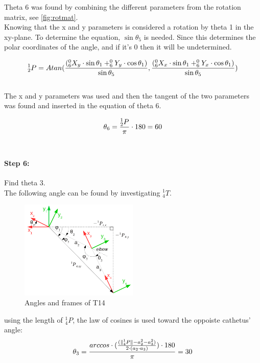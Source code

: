 Theta 6 was found by combining the different parameters from the rotation matrix, see \ref{fig:rotmat}.\\
Knowing that the x and y parameters is considered a rotation by theta 1 in the xy-plane. To determine the equation, $\sin{\theta_5}$ is needed. Since this determines the polar coordinates of the angle, and if it's 0 then it will be undetermined.

\begin{equation}
\centering
_2^1P = Atan(\frac{(_6^0X_y\cdot\sin{\theta_1}+_6^0Y_y\cdot\cos{\theta_1})}{\sin{\theta_5}},\frac{(_6^0X_x\cdot\sin{\theta_1}+_6^0Y_x\cdot\cos{\theta_1})}{\sin{\theta_5}})
\label{P12}
\end{equation}\\

The x and y parameters was used and then the tangent of the two parameters was found and inserted in the equation of theta 6.

\begin{equation}
\centering
\theta_6 = \frac{_2^1P}{\pi} \cdot 180 = 60
\label{theta6}
\end{equation}\\

\paragraph{Step 6:} Find theta 3.\\

The following angle can be found by investigating $_4^1T$.

\begin{figure}[H]
    \centering
    \includegraphics[width=0.5\textwidth]{Design/theta234.png}
    \caption{Angles and frames of T14 \cite{Rasmus}} 
    \label{fig:rasmus3} 
\end{figure}

using the length of $_4^1P$, the law of cosines is used toward the oppoiste cathetus' angle:
\begin{equation}
   \large \theta_3=\frac{arccos\cdot(\frac{(\|_4^1P\|-a_2^2-a_3^2)}{2\cdot(a_2\cdot a_3)})\cdot180}{\pi}=30
\end{equation}

